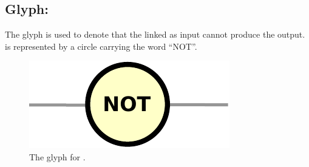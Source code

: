 \subsection{Glyph: }\label{sec:not}

The glyph  is used to denote that the  linked as input cannot produce the output.  is represented by a circle carrying the word ``NOT''.

\begin{figure}[H]
  \centering
  \includegraphics[scale = 0.5]{images/not}
  \caption{The \PD glyph for .}
  \label{fig:not}
\end{figure}

